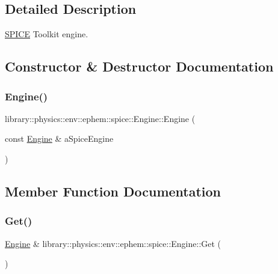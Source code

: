 \subsection{Detailed Description}
\hyperlink{classlibrary_1_1physics_1_1env_1_1ephem_1_1_s_p_i_c_e}{S\+P\+I\+CE} Toolkit engine. 

\subsection{Constructor \& Destructor Documentation}
\mbox{\label{classlibrary_1_1physics_1_1env_1_1ephem_1_1spice_1_1_engine_a26bf9260d2730a6825a975c1a0b49b5b}} 
\subsubsection{\texorpdfstring{Engine()}{Engine()}}
{\footnotesize\ttfamily library\+::physics\+::env\+::ephem\+::spice\+::\+Engine\+::\+Engine (\begin{DoxyParamCaption}\item[{const \hyperlink{classlibrary_1_1physics_1_1env_1_1ephem_1_1spice_1_1_engine}{Engine} \&}]{a\+Spice\+Engine }\end{DoxyParamCaption})\hspace{0.3cm}{\ttfamily [delete]}}



\subsection{Member Function Documentation}
\mbox{\label{classlibrary_1_1physics_1_1env_1_1ephem_1_1spice_1_1_engine_a9d5058448b12c353edcf5a420cec2745}} 
\subsubsection{\texorpdfstring{Get()}{Get()}}
{\footnotesize\ttfamily \hyperlink{classlibrary_1_1physics_1_1env_1_1ephem_1_1spice_1_1_engine}{Engine} \& library\+::physics\+::env\+::ephem\+::spice\+::\+Engine\+::\+Get (\begin{DoxyParamCaption}{ }\end{DoxyParamCaption})\hspace{0.3cm}{\ttfamily [static]}}

